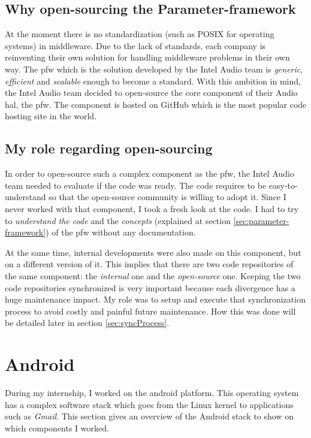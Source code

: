 \subsection{Why open-sourcing the Parameter-framework}\label{sec:whyOpensourcing}
At the moment there is no standardization (such as POSIX for operating systems) in middleware. Due to the lack
of standards, each company is reinventing their own solution for handling middleware problems in their own way.
The \gls{pfw} which is the solution developed by the Intel Audio team is \emph{generic}, \emph{efficient} and \emph{scalable} enough to become a standard.
With this ambition in mind, the Intel Audio team decided to open-source the core component of their Audio \gls{hal}, the \gls{pfw}.
The component is hosted on \gls{GitHub} which is the most popular code hosting site in the world.

\subsection{My role regarding open-sourcing}
In order to open-source such a complex component as the \gls{pfw}, the Intel Audio team needed to evaluate if the code was ready.
The code requires to be easy-to-understand so that the open-source community is willing to adopt it.
Since I never worked with that component, I took a fresh look at the code. I had to try to \emph{understand the code} and the
\emph{concepts} (explained at section \ref{sec:parameter-framework}) of the \gls{pfw} without any documentation.

At the same time, internal developments were also made on this component, but on a different version of it.
This implies that there are two code repositories of the same component: the \emph{internal} one and the \emph{open-source} one.
Keeping the two code repositories synchronized is very important because each divergence has a huge maintenance impact.
My role was to setup and execute that synchronization process to avoid costly and painful future maintenance.
How this was done will be detailed later in section \ref{sec:syncProcess}.



\section{Android}
During my internship, I worked on the \gls{android} platform. This operating
system has a complex software stack which goes from the Linux \gls{kernel} to
applications such as \emph{Gmail}. This section gives an overview of the Android
stack to show on which components I worked.

